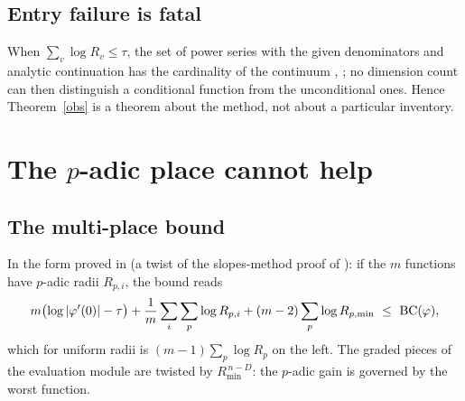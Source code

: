 \documentclass[11pt]{amsart}
\theoremstyle{remark}
\begin{document}
\subsection{Entry failure is fatal} When $\sum_v\log R_v\le\tau$, the set of power series with the given denominators and analytic continuation has the cardinality of the continuum \cite[\S2]{CDTicm}, \cite{DimLNT}; no dimension count can then distinguish a conditional function from the unconditional ones. Hence Theorem~\ref{obs} is a theorem about the method, not about a particular inventory.

\section{The $p$-adic place cannot help}
\subsection{The multi-place bound} In the form proved in \cite[Thm.~2]{Z53} (a twist of the slopes-method proof of \cite[\S6.3]{CDTl2chi}): if the $m$ functions have $p$-adic radii $R_{p,i}$, the bound reads
\[m\bigl(\log|\varphi'(0)|-\tau\bigr)+\frac1m\sum_{i}\sum_p\log R_{p,i}+(m-2)\sum_p\log R_{p,\min}\ \le\ \mathrm{BC}(\varphi),\]
which for uniform radii is $(m-1)\sum_p\log R_p$ on the left. The graded pieces of the evaluation module are twisted by $R_{\min}^{\,n-D}$: the $p$-adic gain is governed by the worst function.
\end{document}
